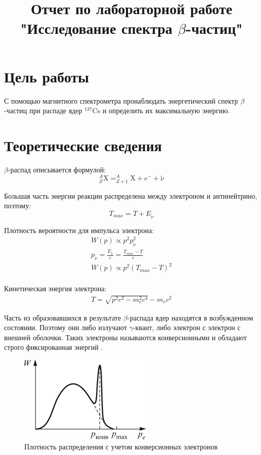 \documentclass[12pt]{article}
\title{Отчет по лабораторной работе "Исследование спектра $\beta$-частиц"}
\date{}
\begin{document}
\maketitle

\section{Цель работы}
С помощью магнитного спектрометра пронаблюдать энергетический спектр
$\beta$-частиц при распаде ядер $^{137}$Cs
и определить их максимальную энергию.

\section{Теоретические сведения}

$\beta$-распад описывается формулой:
\begin{equation*}
    ^A_Z \text{X} = ^A_{Z+1} \text{X} + e^- + \tilde{\nu}
\end{equation*}

Большая часть энергии реакции распределена между электроном и антинейтрино, поэтому:
\begin{equation*}
    T_{max} = T + E_{\tilde{\nu}}
\end{equation*}

Плотность вероятности для импульса электрона:
\begin{gather*}
    W(p) \propto p^2 p_{\tilde{\nu}}^2 \\
    p_{\tilde{\nu}} = \frac{E_{\tilde{\nu}}}{c} = \frac{T_{max} - T}{c} \\
    W(p) \propto p^2 \left( T_{max} - T \right)^2 \\
\end{gather*}

Кинетическая энергия электрона:
\begin{gather*}
    T = \sqrt{p^2 c^2 - m_e^2 c^4} - m_e c^2
\end{gather*}

Часть из образовавшихся в результате $\beta$-распада ядер находятся в возбужденном состоянии.
Поэтому они либо излучают $\gamma$-квант, либо электрон с электрон с внешней оболочки.
Таких электроны называются конверсионными и обладают строго фиксированная энергий .

\begin{figure}[h!]
    \caption{Плотность распределения с учетом конверсионных электронов}
    \centering
    \includegraphics[width=0.5\linewidth]{dist.png}
\end{figure}
\end{document}
